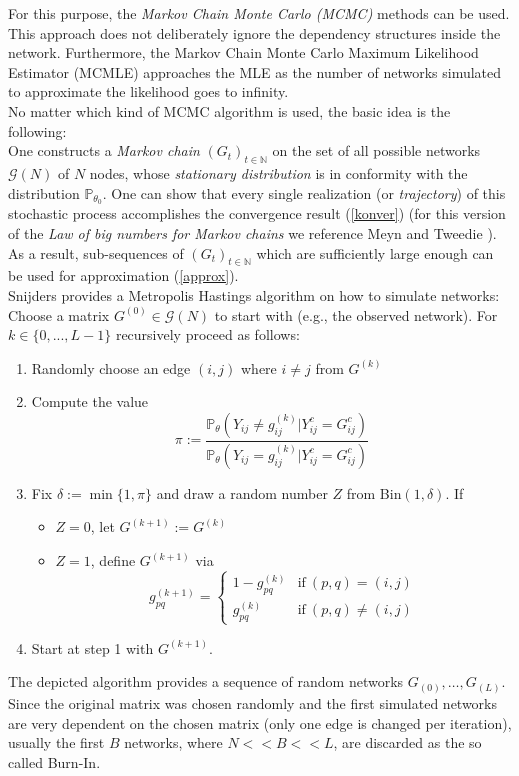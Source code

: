 \documentclass[10pt, conference, compsocconf]{IEEEtran}
\begin{document}
For this purpose, the \textit{Markov Chain Monte Carlo (MCMC)} methods can be used. This approach does not deliberately ignore the dependency structures inside the network. Furthermore, the Markov Chain Monte Carlo Maximum Likelihood Estimator (MCMLE) approaches the MLE as the number of networks simulated to approximate the likelihood goes to infinity.\\[0.3cm]
No matter which kind of MCMC algorithm is used, the basic idea is the following:
\\One constructs a \textit{Markov chain} $(G_t)_{t \in \mathbb{N}}$ on the set of all possible networks $\mathcal{G}(N)$ of $N$ nodes, whose \textit{stationary distribution} is in conformity with the distribution $\mathbb{P}_{\theta_0}$. One can show that every single realization (or \textit{trajectory}) 
of this stochastic process accomplishes the convergence result (\ref{konver}) (for this version of the \textit{Law of big numbers for Markov chains} we reference Meyn and Tweedie \cite{Meyn.2009}). As a result, sub-sequences of $(G_t)_{t \in \mathbb{N}}$ which are sufficiently large enough can be used for approximation (\ref{approx}).\\[0.3cm]
Snijders \cite{Snijders.2002} provides a Metropolis Hastings algorithm on how to simulate networks:
Choose a matrix $G^{(0)} \in \mathcal{G}(N)$ to start with (e.g., the observed network). For $k \in \{0,...,L-1\}$ recursively proceed as follows:\\
\begin{enumerate}
\item Randomly choose an edge $(i,j)$ where $i \neq j$ from $G^{(k)}$
\item Compute the value
$$\pi := \dfrac{\mathbb{P}_{\theta}(Y_{ij} \neq g_{ij}^{(k)} | Y_{ij}^c=G_{ij}^c)}{\mathbb{P}_{\theta}(Y_{ij}= g_{ij}^{(k)} | Y_{ij}^c=G_{ij}^c)}$$
\item Fix $\delta:= \min\{1, \pi\}$ and draw a random number $Z$ from Bin$(1, \delta)$. If
\begin{itemize}
\item $Z=0$, let $G^{(k+1)} := G^{(k)}$ 
\item $Z=1$, define $G^{(k+1)}$ via
$$g_{pq}^{(k+1)}=\begin{cases}
1-g_{pq}^{(k)}& \text{if}~ (p,q)=(i,j) \\
g_{pq}^{(k)} &\text{if}~ (p,q) \neq (i,j) 
\end{cases}$$
\end{itemize}
\item Start at step 1 with $G^{(k+1)}$.
\end{enumerate}
\vspace{0.3cm}
\noindent The depicted algorithm provides a sequence of random networks $G_(0),\dots,G_(L)$. Since the original matrix was chosen randomly and the first simulated networks are very dependent on the chosen matrix (only one edge is changed per iteration), usually
the first $B$ networks, where $N << B << L$, are discarded as the so called Burn-In.
\end{document}
